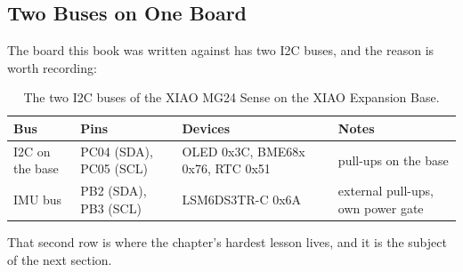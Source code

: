 \subsection{Two Buses on One Board}

The board this book was written against has two I2C buses, and the reason is worth recording:

\begin{table}[H]
\centering
\begin{tabular}{llll}
\hline
\textbf{Bus} & \textbf{Pins} & \textbf{Devices} & \textbf{Notes} \\
\hline
I2C on the base & PC04 (SDA), PC05 (SCL) & OLED 0x3C, BME68x 0x76, RTC 0x51 & pull-ups on the base \\
IMU bus         & PB2 (SDA), PB3 (SCL)  & LSM6DS3TR-C 0x6A                & external pull-ups, own power gate \\
\hline
\end{tabular}
\caption{The two I2C buses of the XIAO MG24 Sense on the XIAO Expansion Base.}
\label{tab:i2c-two-buses}
\end{table}

That second row is where the chapter's hardest lesson lives, and it is the subject of the
next section.
